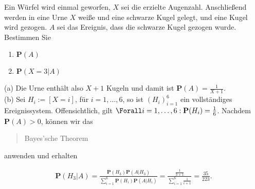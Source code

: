 
\begin{exercise}

Ein Würfel wird einmal geworfen, $X$ sei die erzielte Augenzahl. Anschließend werden in eine Urne $X$ weiße und eine schwarze Kugel gelegt, und eine Kugel wird gezogen. $A$ sei das Ereignis, dass die schwarze Kugel gezogen wurde. Bestimmen Sie

\begin{enumerate}[label = (\alph*)]

  \item
  $\mathbf{P}(A)$
  
  \item
  $\mathbf{P}(X = 3 | A)$

\end{enumerate}

\end{exercise}


\begin{solution}

(a) Die Urne enthält also $X + 1$ Kugeln und damit ist $\mathbf{P}(A) = \frac{1}{X + 1}$. \\

(b) Sei $H_i := [X = i]$, für $i = 1, \ldots, 6$, so ist $(H_i)_{i=1}^6$ ein vollständiges Ereignissystem. Offensichtlich, gilt $\Forall i = 1, \ldots, 6: \mathbf{P}(H_i) = \frac{1}{6}$. Nachdem $\mathbf{P}(A) > 0$, können wir das \blockquote{Bayes'sche Theorem} anwenden und erhalten

\begin{align*}
  \mathbf{P}(H_3 | A)
  =
  \frac
  {\mathbf{P}(H_3) \mathbf{P}(A | H_3)}
  {\sum_{i=1}^6 \mathbf{P}(H_i) \mathbf{P}(A | H_i)}
  =
  \frac
  {\frac{1}{3+1}}
  {\sum_{i=1}^6 \frac{1}{i+1}}
  = \frac{35}{223}.
\end{align*}

\end{solution}

